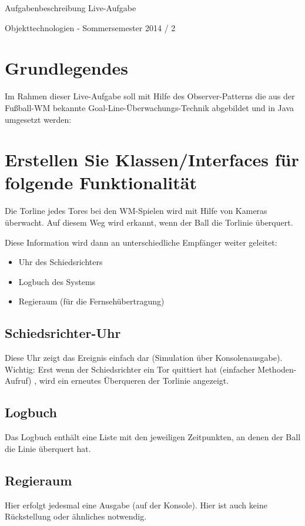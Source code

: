 \documentclass[oneside,a4paper]{scrartcl}
\author{Johannes Schneider}
\begin{document}
\centerline{\sc \large Aufgabenbeschreibung Live-Aufgabe}
\vspace{.5pc}
\centerline{\sc Objekttechnologien - Sommersemester 2014 / 2}
\vspace{2pc}



\section{Grundlegendes}

Im Rahmen dieser Live-Aufgabe soll mit Hilfe des Observer-Patterns die aus der Fußball-WM bekannte Goal-Line-Überwachungs-Technik abgebildet und in Java umgesetzt werden:


\section{Erstellen Sie Klassen/Interfaces für folgende Funktionalität}

Die Torline jedes Tores bei den WM-Spielen wird mit Hilfe von Kameras überwacht. Auf diesem Weg wird
erkannt, wenn der Ball die Torlinie überquert.

Diese Information wird dann an unterschiedliche Empfänger weiter geleitet:

\begin{itemize}
\item Uhr des Schiedsrichters
\item Logbuch des Systems
\item Regieraum (für die Fernsehübertragung)
\end{itemize}


\subsection{Schiedsrichter-Uhr}
Diese Uhr zeigt das Ereignis einfach dar (Simulation über Konsolenausgabe). Wichtig:
Erst wenn der Schiedsrichter ein Tor quittiert hat (einfacher Methoden-Aufruf) , wird ein erneutes Überqueren der Torlinie angezeigt.

\subsection{Logbuch}
Das Logbuch enthält eine Liste mit den jeweiligen Zeitpunkten, an denen der Ball die Linie überquert hat.

\subsection{Regieraum}
Hier erfolgt jedesmal eine Ausgabe (auf der Konsole). Hier ist auch keine Rückstellung oder ähnliches notwendig.
\end{document}
